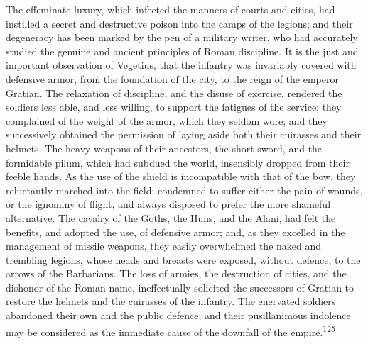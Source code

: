 
The effeminate luxury, which infected the manners of courts and
cities, had instilled a secret and destructive poison into the
camps of the legions; and their degeneracy has been marked by the
pen of a military writer, who had accurately studied the genuine
and ancient principles of Roman discipline. It is the just and
important observation of Vegetius, that the infantry was
invariably covered with defensive armor, from the foundation of
the city, to the reign of the emperor Gratian. The relaxation of
discipline, and the disuse of exercise, rendered the soldiers
less able, and less willing, to support the fatigues of the
service; they complained of the weight of the armor, which they
seldom wore; and they successively obtained the permission of
laying aside both their cuirasses and their helmets. The heavy
weapons of their ancestors, the short sword, and the formidable
pilum, which had subdued the world, insensibly dropped from their
feeble hands. As the use of the shield is incompatible with that
of the bow, they reluctantly marched into the field; condemned to
suffer either the pain of wounds, or the ignominy of flight, and
always disposed to prefer the more shameful alternative. The
cavalry of the Goths, the Huns, and the Alani, had felt the
benefits, and adopted the use, of defensive armor; and, as they
excelled in the management of missile weapons, they easily
overwhelmed the naked and trembling legions, whose heads and
breasts were exposed, without defence, to the arrows of the
Barbarians. The loss of armies, the destruction of cities, and
the dishonor of the Roman name, ineffectually solicited the
successors of Gratian to restore the helmets and the cuirasses of
the infantry. The enervated soldiers abandoned their own and the
public defence; and their pusillanimous indolence may be
considered as the immediate cause of the downfall of the empire.\textsuperscript{125}


